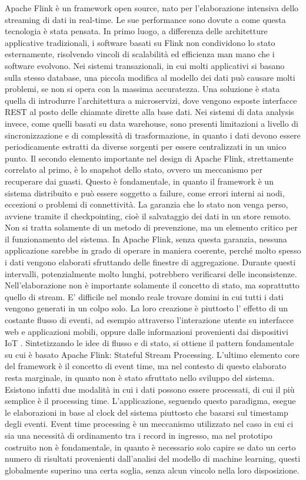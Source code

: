 Apache Flink è un framework open source, nato per l'elaborazione intensiva dello streaming di dati in real-time. Le sue performance sono dovute a come questa tecnologia è stata pensata. In primo luogo, a differenza delle architetture applicative tradizionali, i software basati su Flink non condividono lo stato esternamente, risolvendo vincoli di scalabilità ed efficienza man mano che i software evolvono. Nei sistemi transazionali, in cui molti applicativi si basano sulla stesso database, una piccola modifica al modello dei dati può causare molti problemi, se non si opera con la massima accuratezza. Una soluzione è stata quella di introdurre l'architettura a microservizi, dove vengono esposte interfacce REST al posto delle chiamate dirette alla base dati. Nei sistemi di data analysis invece, come quelli basati su data warehouse, sono presenti limitazioni a livello di sincronizzazione e di complessità di trasformazione, in quanto i dati devono essere periodicamente estratti da diverse sorgenti per essere centralizzati in un unico punto. Il secondo elemento importante nel design di Apache Flink, strettamente correlato al primo, è lo snapshot dello stato, ovvero un meccanismo per recuperare dai guasti. Questo è fondamentale, in quanto il framework è un sistema distribuito e può essere soggetto a failure, come errori interni ai nodi, eccezioni o problemi di connettività. La garanzia che lo stato non venga perso, avviene tramite il checkpointing, cioè il salvataggio dei dati in un store remoto. Non si tratta solamente di un metodo di prevenzione, ma un elemento critico per il funzionamento del sistema. In Apache Flink, senza questa garanzia, nessuna applicazione sarebbe in grado di operare in maniera coerente, perché molto spesso i dati vengono elaborati sfruttando delle finestre di aggregazione. Durante questi intervalli, potenzialmente molto lunghi, potrebbero verificarsi delle inconsistenze. Nell'elaborazione non è importante solamente il concetto di stato, ma soprattutto quello di stream. E' difficile nel mondo reale trovare domini in cui tutti i dati vengono generati in un colpo solo. La loro creazione è piuttosto l' effetto di un costante flusso di eventi, ad esempio attraverso l'interazione utente su interfacce web e applicazioni mobili, oppure dalle informazioni provenienti dai dispositivi IoT \cite{a14Flink}.
Sintetizzando le idee di flusso e di stato, si ottiene il pattern fondamentale su cui è basato Apache Flink: Stateful Stream Processing. L'ultimo elemento core del framework è il concetto di event time, ma nel contesto di questo elaborato resta marginale, in quanto non è stato sfruttato nello sviluppo del sistema. %
Esistono infatti due modalità in cui i dati possono essere processati, di cui il più semplice è il processing time. L'applicazione, seguendo questo paradigma, esegue le elaborazioni in base al clock del sistema piuttosto che basarsi sul timestamp degli eventi. Event time processing è un meccanismo utilizzato nel caso in cui ci sia una necessità di ordinamento tra i record in ingresso, ma nel prototipo costruito non è fondamentale, in quanto è necessario solo capire se dato un certo numero di risultati provenienti dall'analisi del modello di machine learning, questi globalmente superino una certa soglia, senza alcun vincolo nella loro disposizione.

